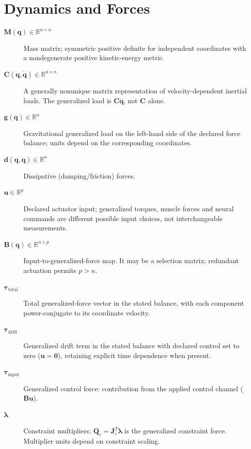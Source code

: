 \section*{Dynamics and Forces}
\begin{description}
    \item[$\bm{M}(\bm{q}) \in \mathbb{R}^{n \times n}$] Mass matrix; symmetric positive definite for independent coordinates with a nondegenerate positive kinetic-energy metric.
    \item[$\bm{C}(\bm{q}, \dot{\bm{q}}) \in \mathbb{R}^{n \times n}$] A generally nonunique matrix representation of velocity-dependent inertial loads. The generalized load is $\bm{C}\dot{\bm{q}}$, not $\bm{C}$ alone.
    \item[$\bm{g}(\bm{q}) \in \mathbb{R}^n$] Gravitational generalized load on the left-hand side of the declared force balance; units depend on the corresponding coordinates.
    \item[$\bm{d}(\bm{q}, \dot{\bm{q}}) \in \mathbb{R}^n$] Dissipative (damping/friction) forces.
    \item[$\bm{u} \in \mathbb{R}^p$] Declared actuator input; generalized torques, muscle forces and neural commands are different possible input choices, not interchangeable measurements.
    \item[$\bm{B}(\bm{q}) \in \mathbb{R}^{n \times p}$] Input-to-generalized-force map. It may be a selection matrix; redundant actuation permits $p>n$.
    \item[$\boldsymbol{\tau}_{\mathrm{total}}$] Total generalized-force vector in the stated balance, with each component power-conjugate to its coordinate velocity.
    \item[$\boldsymbol{\tau}_{\mathrm{drift}}$] Generalized drift term in the stated balance with declared control set to zero ($\bm{u}=\bm{0}$), retaining explicit time dependence when present.
    \item[$\boldsymbol{\tau}_{\mathrm{input}}$] Generalized control force: contribution from the applied control channel ($\bm{B}\bm{u}$).
    \item[$\boldsymbol{\lambda}$] Constraint multipliers; $\bm{Q}_c=\bm{J}_c^T\boldsymbol{\lambda}$ is the generalized constraint force. Multiplier units depend on constraint scaling.
\end{description}

